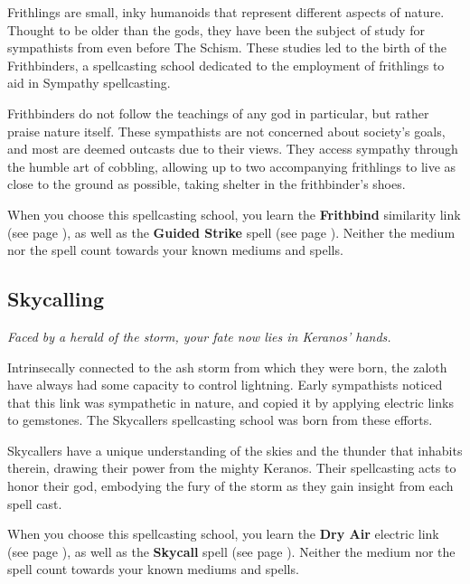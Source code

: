    Frithlings are small, inky humanoids that represent different aspects of nature.
    Thought to be older than the gods, they have been the subject of study for sympathists from even before The Schism.
    These studies led to the birth of the Frithbinders, a spellcasting school dedicated to the employment of frithlings to aid in Sympathy spellcasting.

    Frithbinders do not follow the teachings of any god in particular, but rather praise nature itself.
    These sympathists are not concerned about society's goals, and most are deemed outcasts due to their views.
    They access sympathy through the humble art of cobbling, allowing up to two accompanying frithlings to live as close to the ground as possible, taking shelter in the frithbinder's shoes.

    When you choose this spellcasting school, you learn the \textbf{Frithbind} similarity link (see page \pageref{medium::frithbind}), as well as the \textbf{Guided Strike} spell (see page \pageref{spell::guidedstrike}).
    Neither the medium nor the spell count towards your known mediums and spells.

\subsection*{Skycalling} \label{ssec::skycalling} %
    \textit{Faced by a herald of the storm, your fate now lies in Keranos' hands.}

    Intrinsecally connected to the ash storm from which they were born, the zaloth have always had some capacity to control lightning.
    Early sympathists noticed that this link was sympathetic in nature, and copied it by applying electric links to gemstones.
    The Skycallers spellcasting school was born from these efforts.

    Skycallers have a unique understanding of the skies and the thunder that inhabits therein, drawing their power from the mighty Keranos.
    Their spellcasting acts to honor their god, embodying the fury of the storm as they gain insight from each spell cast.

    When you choose this spellcasting school, you learn the \textbf{Dry Air} electric link (see page \pageref{medium::dryair}), as well as the \textbf{Skycall} spell (see page \pageref{spell::skycall}).
    Neither the medium nor the spell count towards your known mediums and spells.

\newpage
